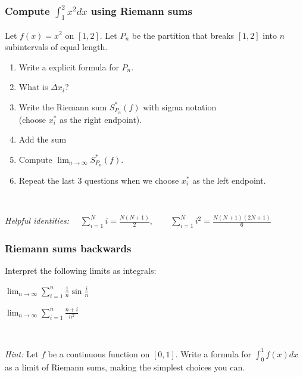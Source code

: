 \documentclass[14pt]{beamer}
\newcommand {\DS} [1] {${\displaystyle #1}$}
\newcommand{\setsize}[1]{\fontsize{#1}{#1}\selectfont} %
\newcommand{\smallerfont}{\setsize{13}} %
\begin{document}
\begin{frame}[t]
\smallerfont
\frametitle{Compute \DS{\int_1^2 \! x^2 dx} using Riemann sums}

\begin{block}{}
Let \DS{f(x) = x^2} on $[1,2]$.  
Let $P_n$ be the partition that breaks $[1,2]$ into $n$ subintervals of equal length.
	\begin{enumerate}
		\item Write a explicit formula for $P_n$.
		\item  What is $\Delta x_i$?
		\item  Write   the Riemann sum \DS{S^*_{P_n} (f)} with sigma notation \\
			(choose $x^*_{i}$ as the right endpoint).
		\item  Add the sum
		\item  Compute \DS{\lim_{n \to \infty} S^*_{P_n} (f)}. 
		\item  Repeat the last 3 questions when we choose $x^*_{i}$ as the left endpoint.
	\end{enumerate}
\end{block}
\

{\setsize{10}
\emph{Helpful identities:} \DS{\quad \sum_{i=1}^N i = \frac{N(N+1)}{2}, \quad \quad \sum_{i=1}^{N} i^2 = \frac{N(N+1)(2N+1)}{6}}
}

\end{frame}
\begin{frame}[t]
\frametitle{Riemann sums backwards}

Interpret the following limits as integrals:
	\begin{enumerate} 
	\end{enumerate}
\

{\setsize{10}  \emph{Hint:}
Let $f$ be a continuous function on $[0,1]$.  Write a formula for \DS{\int_0^1 f(x) dx} as a limit of Riemann sums, making the simplest choices you can.
}

\end{frame}
\end{document}
